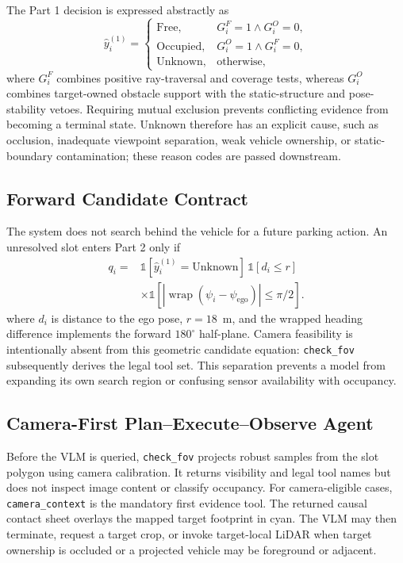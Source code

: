 \documentclass[conference]{IEEEtran}
\begin{document}
The Part 1 decision is expressed abstractly as
\begin{equation}
 \hat y_i^{(1)}=
 \begin{cases}
 \mathrm{Free}, & G_i^F=1 \land G_i^O=0,\\
 \mathrm{Occupied}, & G_i^O=1 \land G_i^F=0,\\
 \mathrm{Unknown}, & \text{otherwise},
 \end{cases}
\end{equation}
where $G_i^F$ combines positive ray-traversal and coverage tests, whereas $G_i^O$ combines target-owned obstacle support with the static-structure and pose-stability vetoes. Requiring mutual exclusion prevents conflicting evidence from becoming a terminal state. Unknown therefore has an explicit cause, such as occlusion, inadequate viewpoint separation, weak vehicle ownership, or static-boundary contamination; these reason codes are passed downstream.

\subsection{Forward Candidate Contract}
The system does not search behind the vehicle for a future parking action. An unresolved slot enters Part 2 only if
\begin{equation}
\begin{aligned}
q_i={}&\mathbb{1}[\hat y_i^{(1)}=\mathrm{Unknown}]\,
       \mathbb{1}[d_i\leq r]\\
     &\times\mathbb{1}\!\left[
       |\operatorname{wrap}(\psi_i-\psi_{\mathrm{ego}})|\leq\pi/2
       \right].
\end{aligned}
\end{equation}
where $d_i$ is distance to the ego pose, $r=18$~m, and the wrapped heading difference implements the forward $180^{\circ}$ half-plane. Camera feasibility is intentionally absent from this geometric candidate equation: \texttt{check\_fov} subsequently derives the legal tool set. This separation prevents a model from expanding its own search region or confusing sensor availability with occupancy.

\subsection{Camera-First Plan--Execute--Observe Agent}
Before the VLM is queried, \texttt{check\_fov} projects robust samples from the slot polygon using camera calibration. It returns visibility and legal tool names but does not inspect image content or classify occupancy. For camera-eligible cases, \texttt{camera\_context} is the mandatory first evidence tool. The returned causal contact sheet overlays the mapped target footprint in cyan. The VLM may then terminate, request a target crop, or invoke target-local LiDAR when target ownership is occluded or a projected vehicle may be foreground or adjacent.
\end{document}
